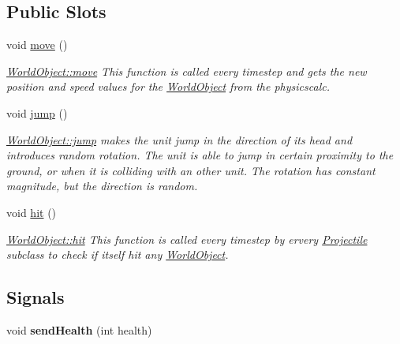 \subsection*{Public Slots}
\begin{DoxyCompactItemize}
\item 
void \hyperlink{class_world_object_af0a581ca569f51047d53677e5d48cf30}{move} ()\hypertarget{class_world_object_af0a581ca569f51047d53677e5d48cf30}{}\label{class_world_object_af0a581ca569f51047d53677e5d48cf30}

\begin{DoxyCompactList}\small\item\em \hyperlink{class_world_object_af0a581ca569f51047d53677e5d48cf30}{World\+Object\+::move} This function is called every timestep and gets the new position and speed values for the \hyperlink{class_world_object}{World\+Object} from the physicscalc. \end{DoxyCompactList}\item 
void \hyperlink{class_world_object_a923e9f81e48251574f1b69f09ebc1c12}{jump} ()\hypertarget{class_world_object_a923e9f81e48251574f1b69f09ebc1c12}{}\label{class_world_object_a923e9f81e48251574f1b69f09ebc1c12}

\begin{DoxyCompactList}\small\item\em \hyperlink{class_world_object_a923e9f81e48251574f1b69f09ebc1c12}{World\+Object\+::jump} makes the unit jump in the direction of its head and introduces random rotation. The unit is able to jump in certain proximity to the ground, or when it is colliding with an other unit. The rotation has constant magnitude, but the direction is random. \end{DoxyCompactList}\item 
void \hyperlink{class_world_object_a5630a513886f232da0174fc992a13ad7}{hit} ()\hypertarget{class_world_object_a5630a513886f232da0174fc992a13ad7}{}\label{class_world_object_a5630a513886f232da0174fc992a13ad7}

\begin{DoxyCompactList}\small\item\em \hyperlink{class_world_object_a5630a513886f232da0174fc992a13ad7}{World\+Object\+::hit} This function is called every timestep by ervery \hyperlink{class_projectile}{Projectile} subclass to check if itself hit any \hyperlink{class_world_object}{World\+Object}. \end{DoxyCompactList}\end{DoxyCompactItemize}
\subsection*{Signals}
\begin{DoxyCompactItemize}
\item 
void {\bfseries send\+Health} (int health)\hypertarget{class_world_object_a92ca617192f2b07350e947056e67b15a}{}\label{class_world_object_a92ca617192f2b07350e947056e67b15a}

\end{DoxyCompactItemize}

